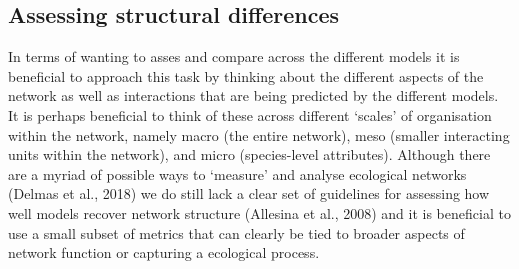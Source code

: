 \documentclass[
]{article}
\begin{document}
\subsection{Assessing structural
differences}\label{assessing-structural-differences}

In terms of wanting to asses and compare across the different models it
is beneficial to approach this task by thinking about the different
aspects of the network as well as interactions that are being predicted
by the different models. It is perhaps beneficial to think of these
across different `scales' of organisation within the network, namely
macro (the entire network), meso (smaller interacting units within the
network), and micro (species-level attributes). Although there are a
myriad of possible ways to `measure' and analyse ecological networks
(Delmas et al., 2018) we do still lack a clear set of guidelines for
assessing how well models recover network structure (Allesina et al.,
2008) and it is beneficial to use a small subset of metrics that can
clearly be tied to broader aspects of network function or capturing a
ecological process.
\end{document}
